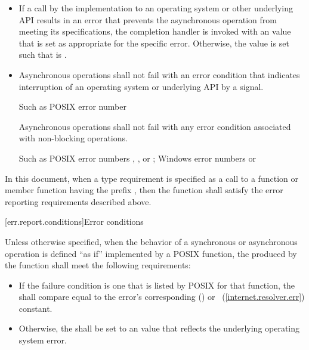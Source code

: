 \begin{itemize}
\item
If a call by the implementation to an operating system or other underlying API results in an error that prevents the asynchronous operation from meeting its specifications, the completion handler is invoked with an  value  that is set as appropriate for the specific error. Otherwise, the  value  is set such that  is .

\item
Asynchronous operations shall not fail with an error condition that indicates interruption of an operating system or underlying API by a signal. \begin{note} Such as POSIX error number  \end{note} Asynchronous operations shall not fail with any error condition associated with non-blocking operations. \begin{note} Such as POSIX error numbers , , or ; Windows error numbers  or  \end{note}
\end{itemize}

\pnum
In this document, when a type requirement is specified as a call to a function or member function having the prefix , then the function shall satisfy the error reporting requirements described above.



[err.report.conditions]{Error conditions}

\pnum
Unless otherwise specified, when the behavior of a synchronous or asynchronous operation is defined ``as if'' implemented by a POSIX function, the  produced by the function shall meet the following requirements:

\begin{itemize}
\item
If the failure condition is one that is listed by POSIX for that function, the  shall compare equal to the error's corresponding  () or ~(\ref{internet.resolver.err}) constant.

\item
Otherwise, the  shall be set to an  value that reflects the underlying operating system error.
\end{itemize}

